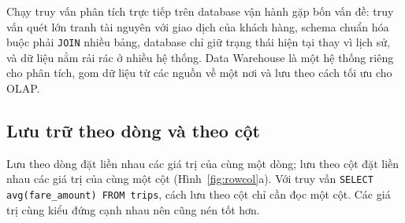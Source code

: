 \documentclass[12pt]{article}
\begin{document}
Chạy truy vấn phân tích trực tiếp trên database vận hành gặp bốn vấn đề: truy vấn quét lớn tranh tài nguyên với giao dịch của khách hàng, schema chuẩn hóa buộc phải \texttt{JOIN} nhiều bảng, database chỉ giữ trạng thái hiện tại thay vì lịch sử, và dữ liệu nằm rải rác ở nhiều hệ thống. Data Warehouse là một hệ thống riêng cho phân tích, gom dữ liệu từ các nguồn về một nơi và lưu theo cách tối ưu cho OLAP.

\subsection{Lưu trữ theo dòng và theo cột}

Lưu theo dòng đặt liền nhau các giá trị của cùng một dòng; lưu theo cột đặt liền nhau các giá trị của cùng một cột (Hình~\ref{fig:rowcol}a). Với truy vấn \texttt{SELECT avg(fare\_amount) FROM trips}, cách lưu theo cột chỉ cần đọc một cột. Các giá trị cùng kiểu đứng cạnh nhau nên cũng nén tốt hơn.
\end{document}
